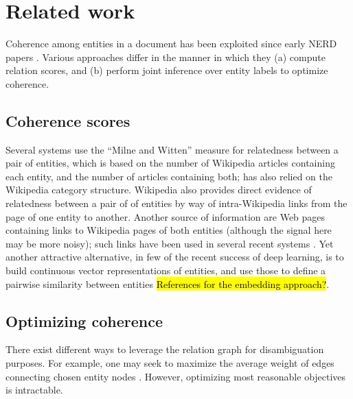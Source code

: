 
\section{Related work}
\label{sec:related}

Coherence among entities in a document has been exploited since early NERD papers \cite{Cucerzan07,Milne2008}.  
Various approaches differ in the manner in which they (a) compute relation scores, and (b) perform joint inference over entity labels to optimize coherence. 

\subsection{Coherence scores}

Several systems \cite{Milne2008,KulkarniSRC09,Hoffart2011} use the ``Milne and Witten'' measure for relatedness between a pair of entities, which is based on the number of Wikipedia articles containing each entity, and the number of articles containing both; \cite{Cucerzan07} has also relied on the Wikipedia category structure. %
Wikipedia also provides direct evidence of relatedness between a pair of of entities by way of intra-Wikipedia links from the page of one entity to another. Another source of information are Web pages containing links to Wikipedia pages of both entities (although the signal here may be more noisy); such links have been used in several recent systems \cite{ChengR13,Chisholm2015}.  Yet another attractive alternative, in few of the recent success of deep learning, is to build continuous vector representations of entities, and use those to define a pairwise similarity between entities \hl{References for the embedding approach?}.


\subsection{Optimizing coherence}

There exist different ways to leverage the relation graph for disambiguation purposes.  For example, one may seek to maximize the average weight of edges connecting chosen entity nodes \cite{Milne2008,Ferragina10}.  However, optimizing most reasonable objectives is intractable.  %

